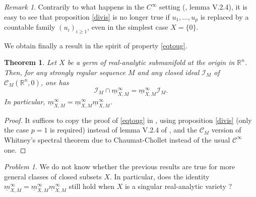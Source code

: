 \documentclass[a4paper]{amsart}
\theoremstyle{plain}
\newtheorem{thm}[subsubsection]{Theorem}
\theoremstyle{definition}
\theoremstyle{remark}
\newtheorem{rem}[subsubsection]{Remark}
\newtheorem*{prob}{Problem}
\newcommand{\imax}{\underline{m}}
\begin{document}
\begin{rem}
Contrarily to what happens in the $ C^\infty $ setting (\cite{Tougbook}, lemma V.2.4), it is easy to see that proposition \ref{divis} is no
longer true if $ u_1,\ldots,u_p $ is replaced by a countable family $ (u_i)_{i\geq 1} $, even in the simplest case $ X=\{0\} $. 
\end{rem}

We obtain finally a result in the spirit of property \eqref{eqtoug}.

\begin{thm}\label{divflat}
Let $ X $ be a germ of real-analytic submanifold at the origin in $ \mathbb{R}^n $. Then, for any  strongly regular sequence $ M $ and 
any closed ideal $ \mathcal{I}_M $ of $ \mathcal{C}_M(\mathbb{R}^n,0) $, one has
\begin{equation*}
\mathcal{I}_M\cap \imax^\infty_{X,M}=\imax^\infty_{X,M}\mathcal{I}_M.
\end{equation*} 
In particular, $ \imax^\infty_{X,M}=\imax^\infty_{X,M}\imax^\infty_{X,M} $.
\end{thm}
\begin{proof}
It suffices to copy the proof of \eqref{eqtoug} in \cite{Tougbook}, using 
proposition \ref{divis} (only the case $ p=1 $ is required) instead of lemma V.2.4 of \cite{Tougbook}, and the $ \mathcal{C}_M $ version of Whitney's spectral theorem due to Chaumat-Chollet \cite{CC3} instead of the usual $ \mathcal{C}^\infty $ one.
\end{proof}

\begin{prob} 
We do not know whether the previous results are true for more general classes of closed subsets $ X $. In particular, does the identity
$ \imax^\infty_{X,M}=\imax^\infty_{X,M}\imax^\infty_{X,M} $ still hold when $ X $ is a singular real-analytic variety ?
\end{prob}
\end{document}
